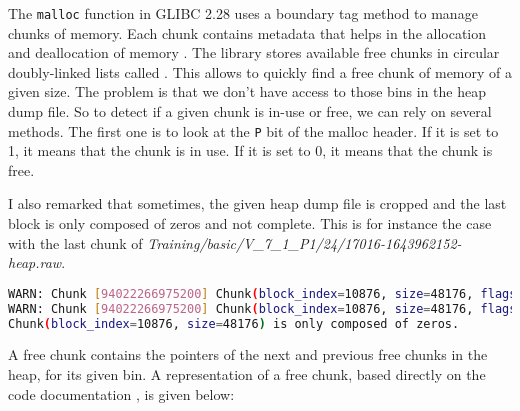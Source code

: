     The \texttt{malloc} function in GLIBC 2.28 uses a boundary tag method to manage chunks of memory. Each chunk contains metadata that helps in the allocation and deallocation of memory \cite{MallocGLIBC2001} \cite{MallocInternalsWiki2023}. The library stores available free chunks in circular doubly-linked lists called . This allows to quickly find a free chunk of memory of a given size. The problem is that we don't have access to those bins in the heap dump file. So to detect if a given chunk is in-use or free, we can rely on several methods. The first one is to look at the \texttt{P} bit of the malloc header. If it is set to 1, it means that the chunk is in use. If it is set to 0, it means that the chunk is free. 

    I also remarked that sometimes, the given heap dump file is cropped and the last block is only composed of zeros and not complete. This is for instance the case with the last chunk of \textit{Training/basic/V\_7\_1\_P1/24/17016-1643962152-heap.raw}.

\begin{lstlisting}[language=bash, caption={Logs from chunk exploration script, related to the last chunk of the file \textit{Training/basic/V\_7\_1\_P1/24/17016-1643962152-heap.raw}. }]
WARN: Chunk [94022266975200] Chunk(block_index=10876, size=48176, flags=[A=False, M=False, P=True]) is out of bounds. Last block index: 16895 Iteration index: 16896 
WARN: Chunk [94022266975200] Chunk(block_index=10876, size=48176, flags=[A=False, M=False, P=True]) is out of bounds. Last block index: 16895 Iteration index: 16897
Chunk(block_index=10876, size=48176) is only composed of zeros.
\end{lstlisting}

    A free chunk contains the pointers of the next and previous free chunks in the heap, for its given bin. A representation of a free chunk, based directly on the code documentation \cite{MallocGLIBC2001}, is given below:

